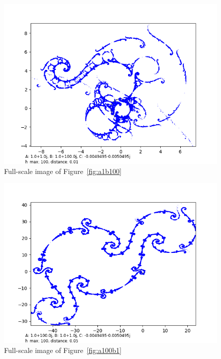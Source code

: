 \documentclass[12pt,a4paper,reqno,parskip=full]{amsart}
\numberwithin{equation}{section}
\theoremstyle{plain}
\theoremstyle{definition}
\begin{document}
\begin{figure}[H]
     \centering
     \includegraphics[width=\textwidth]{images/a1,b100,h100,d.01 custom xy.png}      
     \caption{Full-scale image of Figure~\ref{fig:a1b100}}
\end{figure}

\begin{figure}[H]
        \includegraphics[width=\textwidth]{images/a100,b1,h100,d.05.png}
         \caption{Full-scale image of Figure~\ref{fig:a100b1}}
\end{figure}
\end{document}
